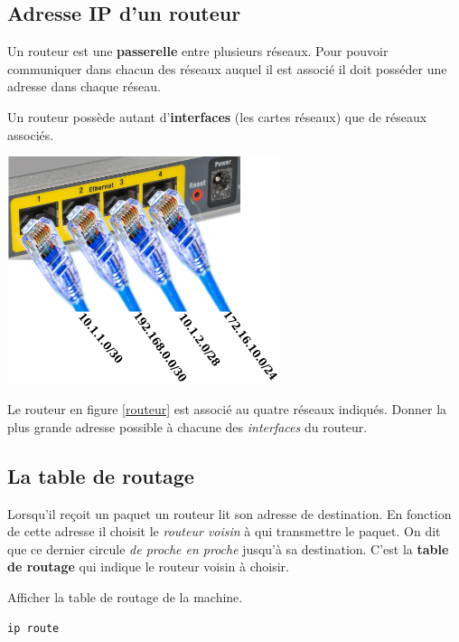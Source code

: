 \documentclass[a4paper,11pt]{article}
\begin{document}
\subsection{Adresse IP d'un routeur}
Un routeur est une \textbf{passerelle} entre plusieurs réseaux. Pour pouvoir communiquer dans chacun des réseaux auquel il est associé il doit posséder une adresse dans chaque réseau. 
\begin{aretenir}[]
    Un routeur possède autant d'\textbf{interfaces} (les cartes réseaux) que de réseaux associés.
\end{aretenir}
\begin{center}
    \centering
    \includegraphics[width=8cm]{ressources/routeur-adresses.png}
    \label{routeur}
\end{center}
\begin{activite}
Le routeur en figure \ref{routeur} est associé au quatre réseaux indiqués. Donner la plus grande adresse possible à chacune des \emph{interfaces} du routeur.
\end{activite}
\subsection{La table de routage}
Lorsqu'il reçoit un paquet un routeur lit son adresse de destination. En fonction de cette adresse il choisit le \emph{routeur voisin} à qui transmettre le paquet. On dit que ce dernier circule \emph{de proche en proche} jusqu'à sa destination. C'est la \textbf{table de routage} qui indique le routeur voisin à choisir.
\begin{activite}
Afficher la table de routage de la machine.
\begin{lstlisting}[language=bash]
ip route
        \end{lstlisting}
\end{activite}
\end{document}
